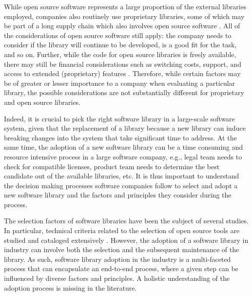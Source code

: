 \documentclass[sigconf,review,anonymous, table]{acmart}
\begin{document}
While open source software represents a large proportion of the external libraries employed, companies also routinely use proprietary libraries, some of which may be part of a long supply chain which also involves open source software \cite{harutyunyan:2018:understanding}. All of the considerations of open source software still apply: the company needs to consider if the library will continue to be developed, is a good fit for the task, and so on. Further, while the code for open source libraries is freely available, there may still be financial considerations such as switching costs, support, and access to extended (proprietary) features \cite{dahlander2006business}. Therefore, while certain factors may be of greater or lesser importance to a company when evaluating a particular library, the possible considerations are not substantially different for proprietary and open source libraries. 

Indeed, it is crucial to pick the right software library in a large-scale software system, given that the replacement of a library because a new library can induce breaking changes into the system that take significant time to address. At the same time, the adoption of a new software library can be a time consuming and resource intensive process in a large software company, e.g., legal team needs to check for compatible licenses, product team needs to determine the best candidate out of the available libraries, etc. It is thus important to understand the decision making processes software companies follow to select and adopt a new software library and the factors and principles they consider during the process. 

The selection factors of software libraries have been the subject of several studies. In particular, technical criteria related to the selection of open source tools are studied and cataloged extensively \cite{wasserman2017osspal, li2022exploring, larios2020selecting, huang2018tell, wang2020difftech, wang2021difftech, uddin2017automatic, uddin2017opiner, de2018library, de2018empirical, el2020libcomp, yan2022concept, liu2021api, uddin2019understanding, larios2020selecting}. However, the adoption of a software library in industry can involve both the selection and the subsequent maintenance of the library. As such, software library adoption in the industry is a multi-faceted process that can encapsulate an end-to-end process, where a given step can be influenced by diverse factors and principles.  A holistic understanding of the adoption process is missing in the literature. 
\end{document}
